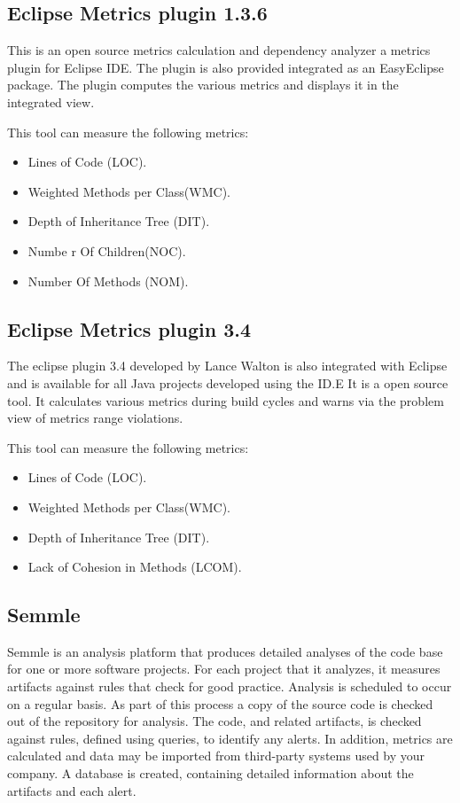 \subsection{Eclipse Metrics plugin 1.3.6}

This  is an open source metrics calculation and dependency analyzer a  metrics plugin for Eclipse IDE. The plugin is also provided 
integrated  as  an  EasyEclipse  package.  The  plugin computes   the  various metrics and displays it in the integrated view.


This tool can measure the following metrics:

\begin{itemize}
	\item Lines of Code (LOC). 
	\item Weighted Methods per Class(WMC).
	\item Depth of Inheritance Tree (DIT).
 	\item Numbe r Of Children(NOC).
    \item Number Of Methods (NOM).
\end{itemize}

\subsection{Eclipse Metrics plugin 3.4}
The  eclipse  plugin  3.4 developed  by  Lance  Walton  is  also  integrated  with Eclipse   and   is   available   for   all   Java   projects 
developed using the ID.E It is a open source tool. It calculates various metrics during build cycles and warns via the problem view of metrics range violations.

This tool can measure the following metrics:
\begin{itemize}
	\item Lines of Code (LOC). 
	\item Weighted Methods per Class(WMC).
	\item Depth of Inheritance Tree (DIT).
    \item Lack of Cohesion in Methods (LCOM).
\end{itemize}

\subsection{Semmle}

Semmle is an analysis platform that produces detailed analyses of the code base for one or more software projects. For each project that it analyzes, it measures artifacts against rules that check for good practice. Analysis is scheduled to occur on a regular basis. As part of this process a copy of the source code is checked out of the repository for analysis. The code, and related artifacts, is checked against rules, defined using queries, to identify any alerts. In addition, metrics are calculated and data may be imported from third-party systems used by your company. A database is created, containing detailed information about the artifacts and each alert.

